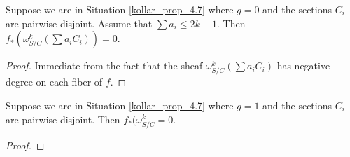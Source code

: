 \begin{lemma}\label{base_case_genus_0}
Suppose we are in Situation \ref{kollar_prop_4.7} where $g=0$ and the sections $C_i$ are pairwise disjoint.
Assume that $\sum a_i\le 2k-1$.
Then $f_{*}(\omega_{S/C}^{k}(\sum a_iC_i))=0$. 
\end{lemma}
\begin{proof}
Immediate from the fact that the sheaf $\omega_{S/C}^{k}(\sum a_iC_i)$ has negative degree on each fiber of $f$.
\end{proof}

\begin{lemma}\label{base_case_genus_1}
Suppose we are in Situation \ref{kollar_prop_4.7} where $g=1$ and the sections $C_i$ are pairwise disjoint.
Then $f_{*}(\omega_{S/C}^{k}=0$. 
\end{lemma}
\begin{proof}

\end{proof}

